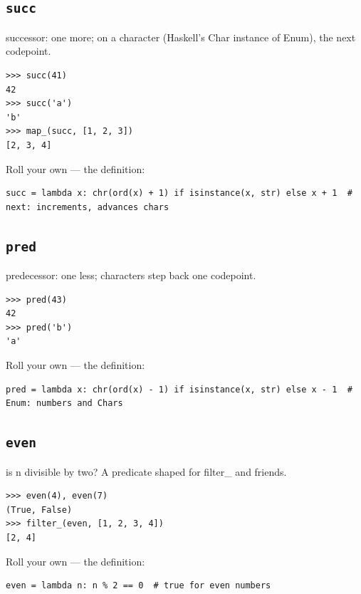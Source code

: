 \documentclass[10pt,letterpaper]{book}
\begin{document}
\subsection{\texttt{succ}}\label{def:succ}
successor: one more; on a character (Haskell's Char instance of Enum), the next codepoint.
\begin{lstlisting}[style=ex]
>>> succ(41)
42
>>> succ('a')
'b'
>>> map_(succ, [1, 2, 3])
[2, 3, 4]
\end{lstlisting}

Roll your own --- the definition:

\begin{lstlisting}[style=ex]
succ = lambda x: chr(ord(x) + 1) if isinstance(x, str) else x + 1  # next: increments, advances chars
\end{lstlisting}

\subsection{\texttt{pred}}\label{def:pred}
predecessor: one less; characters step back one codepoint.
\begin{lstlisting}[style=ex]
>>> pred(43)
42
>>> pred('b')
'a'
\end{lstlisting}

Roll your own --- the definition:

\begin{lstlisting}[style=ex]
pred = lambda x: chr(ord(x) - 1) if isinstance(x, str) else x - 1  # Enum: numbers and Chars
\end{lstlisting}
\subsection{\texttt{even}}\label{def:even}
is n divisible by two? A predicate shaped for filter\_ and friends.
\begin{lstlisting}[style=ex]
>>> even(4), even(7)
(True, False)
>>> filter_(even, [1, 2, 3, 4])
[2, 4]
\end{lstlisting}

Roll your own --- the definition:

\begin{lstlisting}[style=ex]
even = lambda n: n % 2 == 0  # true for even numbers
\end{lstlisting}
\end{document}

